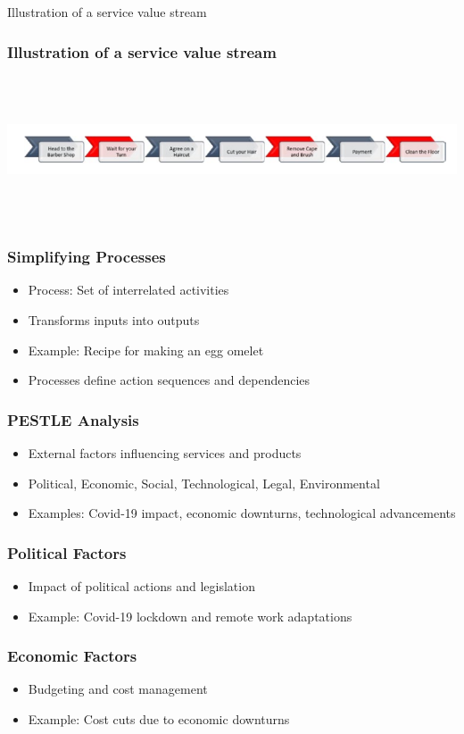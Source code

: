 \documentclass[aspectratio=169, table]{beamer}
\begin{document}
\begin{frame}{Illustration of a service value stream} 	 \frametitle{ Illustration of a service value stream} \begin{center} 	\includegraphics[width=0.8\linewidth]{images/image-02.png} \end{center} \end{frame}

\begin{frame}
	\frametitle{Simplifying Processes}
	\begin{itemize}
		\item Process: Set of interrelated activities
		\item Transforms inputs into outputs
		\item Example: Recipe for making an egg omelet
		\item Processes define action sequences and dependencies
	\end{itemize}
\end{frame}

\begin{frame}
	\frametitle{PESTLE Analysis}
	\begin{itemize}
		\item External factors influencing services and products
		\item Political, Economic, Social, Technological, Legal, Environmental
		\item Examples: Covid-19 impact, economic downturns, technological advancements
	\end{itemize}
\end{frame}

\begin{frame}
	\frametitle{Political Factors}
	\begin{itemize}
		\item Impact of political actions and legislation
		\item Example: Covid-19 lockdown and remote work adaptations
	\end{itemize}
\end{frame}

\begin{frame}
	\frametitle{Economic Factors}
	\begin{itemize}
		\item Budgeting and cost management
		\item Example: Cost cuts due to economic downturns
	\end{itemize}
\end{frame}
\end{document}
